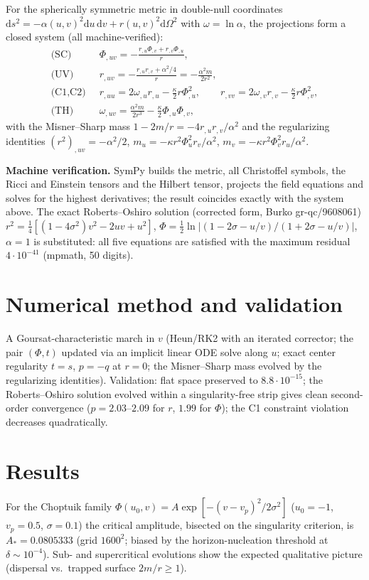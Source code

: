 \documentclass[11pt,a4paper]{article}
\begin{document}
For the spherically symmetric metric in double-null coordinates
$\mathrm{d}s^2=-\alpha(u,v)^2\mathrm{d}u\,\mathrm{d}v+r(u,v)^2\mathrm{d}\Omega^2$
with $\omega=\ln\alpha$, the projections form a closed system
(all machine-verified):
\begin{align*}
\text{(SC)}\;\; & \Phi_{,uv}=-\frac{r_{,u}\Phi_{,v}+r_{,v}\Phi_{,u}}{r},\\
\text{(UV)}\;\; & r_{,uv}=-\frac{r_{,u}r_{,v}+\alpha^2/4}{r}
= -\frac{\alpha^2 m}{2r^2},\\
\text{(C1,C2)}\;\; & r_{,uu}=2\omega_{,u}r_{,u}-\tfrac{\kappa}{2}r\Phi_{,u}^2,
\qquad r_{,vv}=2\omega_{,v}r_{,v}-\tfrac{\kappa}{2}r\Phi_{,v}^2,\\
\text{(TH)}\;\; & \omega_{,uv}=\frac{\alpha^2 m}{2r^3}
-\tfrac{\kappa}{2}\Phi_{,u}\Phi_{,v},
\end{align*}
with the Misner--Sharp mass $1-2m/r=-4r_{,u}r_{,v}/\alpha^2$ and the
regularizing identities
$(r^2)_{,uv}=-\alpha^2/2$,
$m_u=-\kappa r^2\Phi_u^2r_v/\alpha^2$,
$m_v=-\kappa r^2\Phi_v^2r_u/\alpha^2$.

\textbf{Machine verification.} SymPy builds the metric, all Christoffel
symbols, the Ricci and Einstein tensors and the Hilbert tensor, projects the
field equations and solves for the highest derivatives; the result coincides
exactly with the system above. The exact Roberts--Oshiro solution (corrected
form, Burko gr-qc/9608061)
$r^2=\tfrac14[(1-4\sigma^2)v^2-2uv+u^2]$,
$\Phi=\tfrac12\ln|(1-2\sigma-u/v)/(1+2\sigma-u/v)|$, $\alpha=1$
is substituted: all five equations are satisfied with the maximum residual
$4\cdot10^{-41}$ (mpmath, 50 digits).

\section{Numerical method and validation}
A Goursat-characteristic march in $v$ (Heun/RK2 with an iterated corrector;
the pair $(\Phi,t)$ updated via an implicit linear ODE solve along $u$;
exact center regularity $t=s$, $p=-q$ at $r=0$; the Misner--Sharp mass evolved
by the regularizing identities). Validation: flat space preserved to
$8.8\cdot10^{-15}$; the Roberts--Oshiro solution evolved within a
singularity-free strip gives clean second-order convergence
($p=2.03$--$2.09$ for $r$, $1.99$ for $\Phi$); the C1 constraint violation
decreases quadratically.

\section{Results}
For the Choptuik family $\Phi(u_0,v)=A\exp[-(v-v_p)^2/2\sigma^2]$
($u_0=-1$, $v_p=0.5$, $\sigma=0.1$) the critical amplitude, bisected on the
singularity criterion, is
$A_*=0.0805333$ (grid $1600^2$; biased by the horizon-nucleation threshold at
$\delta\sim10^{-4}$). Sub- and supercritical evolutions show the expected
qualitative picture (dispersal vs.\ trapped surface $2m/r\ge1$).
\end{document}
